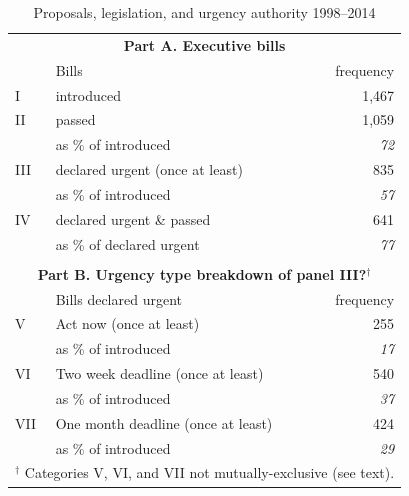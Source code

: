 \documentclass[letter,12pt]{article}
\begin{document}
\begin{table}
\centering
\caption{Proposals, legislation, and urgency authority 1998--2014}\label{T:billDescriptives}
\begin{tabular}{llr}
\multicolumn{3}{c}{\textbf{Part A. Executive bills}} \\
   & Bills                           &   frequency  \\ \hline
I  & introduced                      &       1,467  \\ \hdashline
II & passed                          &       1,059  \\
   & as \% of introduced             &   \emph{72}  \\ \hdashline
III& declared urgent (once at least) &         835  \\
   & as \% of introduced             &   \emph{57}  \\ \hdashline
IV & declared urgent \& passed       &         641  \\
   & as \% of declared urgent        &   \emph{77}  \\ \hline
\\
\multicolumn{3}{c}{\textbf{Part B. Urgency type breakdown of panel III?$^\dagger$}} \\
    & Bills declared urgent                        &  frequency   \\ \hline
V   & Act now (once at least)                      &         255  \\
    & as \% of introduced                          &   \emph{17}  \\ \hdashline
VI  & Two week deadline (once at least)            &         540  \\
    & as \% of introduced                          &   \emph{37}  \\ \hdashline
VII & One month deadline (once at least)           &         424  \\
    & as \% of introduced                          &   \emph{29}  \\ %
\hline
\multicolumn{3}{r}{\footnotesize{$^\dagger$ Categories V, VI, and VII not mutually-exclusive (see text).}} \\
\end{tabular}
\end{table}
\end{document}
